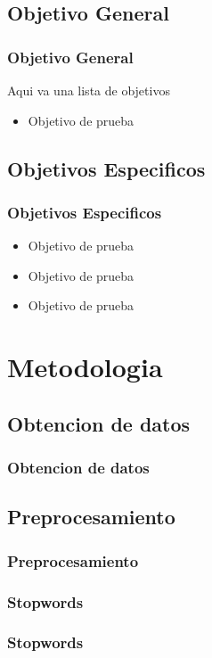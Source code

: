 \documentclass{beamer}
\begin{document}
\subsection{Objetivo General}
\begin{frame}
\frametitle{Objetivo General}
Aqui va una lista de objetivos
\begin{itemize}
\item Objetivo de prueba
\end{itemize}
\end{frame}

\subsection{Objetivos Especificos}
\begin{frame}
\frametitle{Objetivos Especificos}
\begin{itemize}
\item Objetivo de prueba
\item Objetivo de prueba
\item Objetivo de prueba
\end{itemize}

\end{frame}



\section{Metodologia}

\subsection{Obtencion de datos}
\begin{frame}
\frametitle{Obtencion de datos}
\end{frame}


\subsection{Preprocesamiento}
\begin{frame}
\frametitle{Preprocesamiento}
\end{frame}


\subsubsection{Stopwords}
\begin{frame}
\frametitle{Stopwords}
\end{frame}
\end{document}
